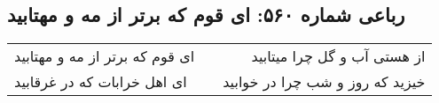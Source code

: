 \begin{center}
\section*{رباعی شماره ۵۶۰: ای قوم که برتر از مه و مهتابید}
\label{sec:0560}
\begin{longtable}{l p{0.5cm} r}
ای قوم که برتر از مه و مهتابید
&&
از هستی آب و گل چرا میتابید
\\
ای اهل خرابات که در غرقابید
&&
خیزید که روز و شب چرا در خوابید
\\
\end{longtable}
\end{center}
